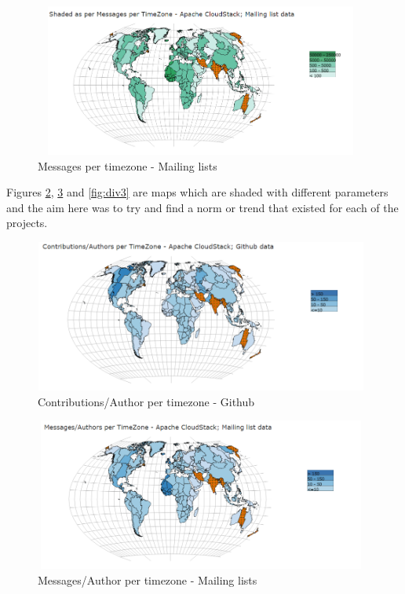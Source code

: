 \documentclass[seploa]{beavtex}
\begin{document}
\begin{figure}[H]
\centering
\includegraphics[width=110mm,height=50mm]{image7.PNG}
\caption{Messages per timezone - Mailing lists}
\label{fig:mgML}
\end{figure}

Figures \ref{fig:div1}, \ref{fig:div2} and \ref{fig:div3} are maps which are shaded with different parameters and the aim here was to try and find a norm or trend that existed for each of the projects.

\begin{figure}[H]
\centering
\includegraphics[width=110mm,height=50mm]{image8.PNG}
\caption{Contributions/Author per timezone - Github}
\label{fig:div1}
\end{figure}

\begin{figure}[H]
\centering
\includegraphics[width=110mm,height=50mm]{image9.PNG}
\caption{Messages/Author per timezone - Mailing lists}
\label{fig:div2}
\end{figure}
\end{document}
